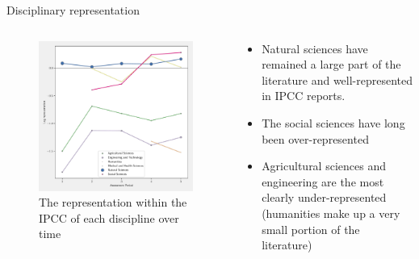 \documentclass[9pt]{beamer}
\begin{document}
\begin{frame}{Disciplinary representation}
\begin{columns}
	\begin{column}{0.618\linewidth}
\begin{figure}[h!]
	\begin{center}
		\includegraphics[width=0.85\linewidth]{../plots/ipcc_representation/ipcc_rep_oecds_time.pdf}
		\caption{The representation within the IPCC of each discipline over time}
		\label{oecd_rep}
	\end{center}
\end{figure}
	\end{column}
	\begin{column}{0.382\linewidth}
		\begin{itemize}
			\item<1-> Natural sciences have remained a large part of the literature and well-represented in IPCC reports. 
			\item<2-> The social sciences have long been over-represented
			\item<3-> Agricultural sciences and engineering are the most clearly under-represented (humanities make up a very small portion of the literature)
			
		\end{itemize}
	\end{column}
\end{columns}
\end{frame}

\end{document}
